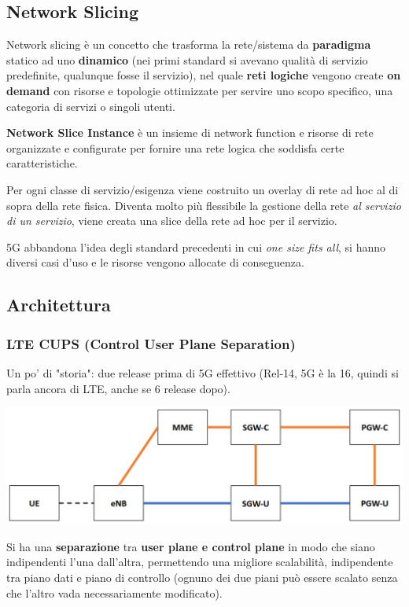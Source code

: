 \subsection{Network Slicing}

Network slicing è un concetto che trasforma la rete/sistema  da \textbf{paradigma} statico ad uno \textbf{dinamico} (nei primi standard si avevano qualità di servizio predefinite, qualunque fosse il servizio), nel quale \textbf{reti logiche} vengono create \textbf{on demand} con risorse e topologie ottimizzate per servire uno scopo specifico, una categoria di servizi o singoli utenti.

\textbf{Network Slice Instance} è un insieme di network function e risorse di rete organizzate e configurate per fornire una rete logica che soddisfa certe caratteristiche.

Per ogni classe di servizio/esigenza viene costruito un overlay di rete ad hoc al di sopra della rete fisica. Diventa molto più flessibile la gestione della rete \textit{al servizio di un servizio}, viene creata una slice della rete ad hoc per il servizio.

5G abbandona l'idea degli standard precedenti in cui \textit{one size fits all}, si hanno diversi casi d'uso e le risorse vengono allocate di conseguenza.


\subsection{Architettura}

\subsubsection{LTE CUPS (Control User Plane Separation)}

Un po' di "storia": due release prima di 5G effettivo (Rel-14, 5G è la 16, quindi si parla ancora di LTE, anche se 6 release dopo). 
\begin{center}
	\includegraphics[width=0.7\linewidth]{img/5g/ltecups}
\end{center}
Si ha una \textbf{separazione} tra \textbf{user plane e control plane} in modo che siano indipendenti l'una dall'altra, permettendo una migliore scalabilità, indipendente tra piano dati e piano di controllo (ognuno dei due piani può essere scalato senza che l'altro vada necessariamente modificato). 

